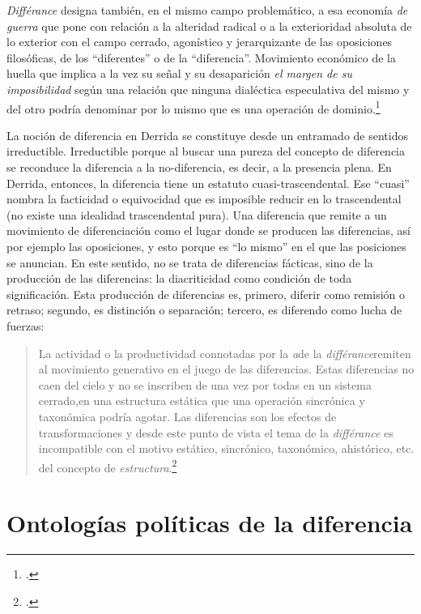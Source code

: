 \emph{Différance} designa también, en el mismo campo problemático, a esa economía \emph{\rdm{}de guerra\emph{}} que pone con relación a la alteridad radical o a la exterioridad absoluta de lo exterior con el campo cerrado, agonístico y jerarquizante de las oposiciones filosóficas, de los \enquote{diferentes} o de la \enquote{diferencia}. Movimiento económico de la huella que implica a la vez su señal y su desaparición \emph{\rdm{}el margen de su imposibilidad\emph{}} según una relación que ninguna dialéctica especulativa del mismo y del otro podría denominar por lo mismo que es una operación de dominio.\footcite[9]{@6983-DERRIDA1997}

La noción de diferencia en Derrida se constituye desde un entramado de sentidos irreductible. Irreductible porque al buscar una pureza del concepto de diferencia se reconduce la diferencia a la no-diferencia, es decir, a la presencia plena. En Derrida, entonces, la diferencia tiene un estatuto cuasi-trascendental. Ese \enquote{cuasi} nombra la facticidad o equivocidad que es imposible reducir en lo trascendental (no existe una idealidad trascendental pura). Una diferencia que remite a un movimiento de diferenciación como el lugar donde se producen las diferencias, así por ejemplo las oposiciones, y esto porque es \enquote{lo mismo} en el que las posiciones se anuncian. En este sentido, no se trata de diferencias fácticas, sino de la producción de las diferencias: la diacriticidad como condición de toda significación. Esta producción de diferencias es, primero, diferir como remisión o retraso; segundo, es distinción o separación; tercero, es diferendo como lucha de fuerzas:

\begin{quote}
La actividad o la productividad connotadas por la \emph{a}de la \emph{différance}remiten al movimiento generativo en el juego de las diferencias. Estas diferencias no caen del cielo y no se inscriben de una vez por todas en un sistema cerrado,en una estructura estática que una operación sincrónica y taxonómica podría agotar. Las diferencias son los efectos de transformaciones y desde este punto de vista el tema de la \emph{différance} es incompatible con el motivo estático, sincrónico, taxonómico, ahistórico, etc. del concepto de \emph{estructura}.\footcite[37]{@6983-DERRIDA1997}
\end{quote}

\section{Ontologías políticas de la diferencia}

